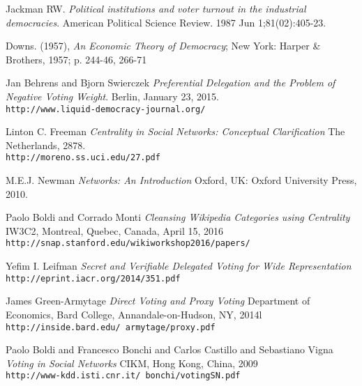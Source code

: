 \documentclass[10pt]{article}
\theoremstyle{definition}
\begin{document}
\begin{thebibliography}{9}

Jackman RW. \textit{Political institutions and voter turnout in the industrial democracies}. American Political Science Review. 1987 Jun 1;81(02):405-23.

Downs. (1957), \textit{An Economic Theory of Democracy}; New York: Harper \& Brothers, 1957; p. 244-46, 266-71

Jan Behrens and Bjorn Swierczek
\textit{Preferential Delegation and the Problem of Negative Voting Weight}. 
Berlin, January 23, 2015.
\\\texttt{http://www.liquid-democracy-journal.org/}


Linton C. Freeman
\textit{Centrality in Social Networks: Conceptual Clarification}
The Netherlands, 2878.
\\\texttt{http://moreno.ss.uci.edu/27.pdf}

M.E.J. Newman
\textit{Networks: An Introduction}
Oxford, UK: Oxford University Press, 2010.

Paolo Boldi and Corrado Monti
\textit{Cleansing Wikipedia Categories using Centrality}
IW3C2, Montreal, Quebec, Canada, April 15, 2016
\\\texttt{http://snap.stanford.edu/wikiworkshop2016/papers/}

Yefim I. Leifman
\textit{Secret and Verifiable Delegated Voting for Wide
Representation}
\\\texttt{http://eprint.iacr.org/2014/351.pdf}

James Green-Armytage
\textit{Direct Voting and Proxy Voting}
Department of Economics, Bard College, Annandale-on-Hudson, NY, 2014l
\\\texttt{http://inside.bard.edu/~armytage/proxy.pdf}

Paolo Boldi and Francesco Bonchi and Carlos Castillo and Sebastiano Vigna
\textit{Voting in Social Networks}
CIKM, Hong Kong, China, 2009
\\\texttt{http://www-kdd.isti.cnr.it/~bonchi/votingSN.pdf}

\end{thebibliography}
\end{document}
